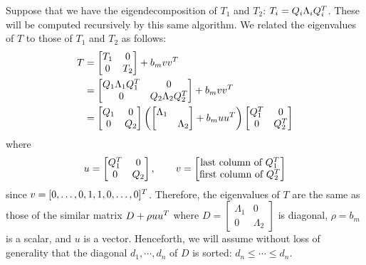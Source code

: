 \documentclass{article}
\begin{document}
Suppose that we have the eigendecomposition of $T_1$ and $T_2$:
$T_i = Q_i\Lambda_iQ_i^{T}$. These will be computed recursively by this same
algorithm. We related the eigenvalues of $T$ to those of $T_1$ and $T_2$ as
follows:
\begin{equation}
  \notag
  \begin{aligned}
    T & =
        \begin{bmatrix}
          T_1 & 0 \\ 0 & T_2
        \end{bmatrix}
        + b_mvv^{T} \\
      & =
        \begin{bmatrix}
          Q_1\Lambda_1Q_1^{T} & 0 \\ 0 & Q_2\Lambda_2Q_2^{T}
        \end{bmatrix}
        + b_mvv^{T}\\
      & =
        \begin{bmatrix}
          Q_1 & 0 \\ 0 & Q_2
        \end{bmatrix}
        \left(
        \begin{bmatrix}
          \Lambda_1 & \\ & \Lambda_2
        \end{bmatrix} + b_muu^{T}
        \right)
        \begin{bmatrix}
          Q_1^{T} & 0 \\ 0 & Q_2^{T}
        \end{bmatrix}
  \end{aligned}
\end{equation}
where
\begin{equation*}
  u =
  \begin{bmatrix}
    Q_1^{T} & 0 \\ 0 & Q_2
  \end{bmatrix}, \qquad
  v =
  \begin{bmatrix}
    \text{last column of $Q_1^{T}$} \\ \text{first column of $Q_2^{T}$}
  \end{bmatrix}
\end{equation*}
since $v = [0,\dots,0,1,1,0,\dots,0]^{T}$. Therefore, the eigenvalues of $T$
are the same as those of the similar matrix $D + \rho uu^{T}$ where $D =
\begin{bmatrix}
  \Lambda_1 & 0 \\ 0 & \Lambda_2
\end{bmatrix}
$ is diagonal, $\rho = b_m$ is a scalar, and $u$ is a vector. Henceforth,
we will assume without loss of generality that the diagonal
$d_1,\cdots,d_n$ of $D$ is sorted: $d_n\leq\cdots\leq d_n$.
\end{document}

